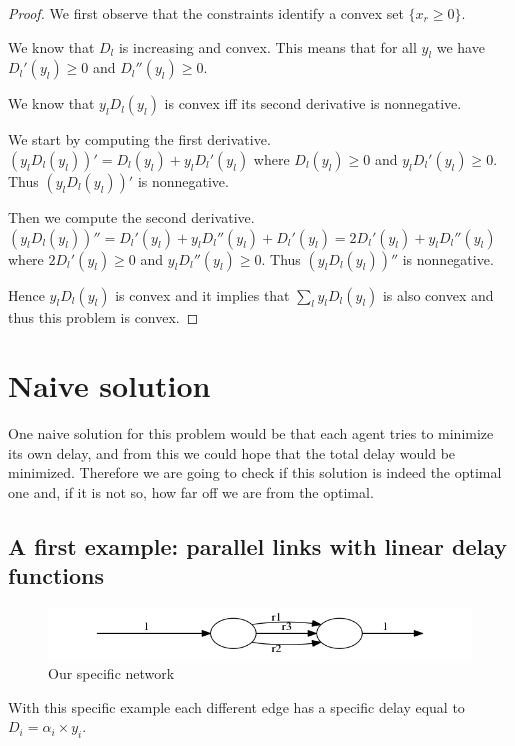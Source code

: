 \begin{proof}
	We first observe that the constraints identify a convex set $\{x_r \ge 0 \}$.
	
        We know that $D_l$ is increasing and convex. This means that for all $y_l$ we have $D_l'(y_l) \ge 0$ and $D_l''(y_l) \ge 0$.

        We know that $y_lD_l(y_l)$ is convex iff its second derivative is nonnegative.

        We start by computing the first derivative. $(y_lD_l(y_l))' = D_l(y_l) + y_lD_l'(y_l)$ where $D_l(y_l) \ge 0$ and $y_lD_l'(y_l) \ge 0$. Thus $(y_lD_l(y_l))'$ is nonnegative.

        Then we compute the second derivative. $(y_lD_l(y_l))'' = D_l'(y_l) + y_lD_l''(y_l) + D_l'(y_l) = 2D_l'(y_l) + y_lD_l''(y_l)$ where $2D_l'(y_l) \ge 0$ and $y_lD_l''(y_l) \ge 0$. Thus $(y_lD_l(y_l))''$ is nonnegative.

        Hence $y_lD_l(y_l)$ is convex and it implies that $\sum\limits_{l} y_{l}D_{l}(y_{l})$ is also convex and thus this problem is convex.
\end{proof}

\section{Naive solution}

One naive solution for this problem would be that each agent tries to minimize its own delay, and from this we could hope that the total delay would be minimized. Therefore we are going to check if this solution is indeed the optimal one and, if it is not so, how far off we are from the optimal.

\subsection{A first example: parallel links with linear delay functions}

\begin{figure}[h]
\centering
\includegraphics[scale=0.5]{output.png}
\caption{Our specific network}
\end{figure}

With this specific example each different edge has a specific delay equal to $ D_i = \alpha_i \times y_i$.


